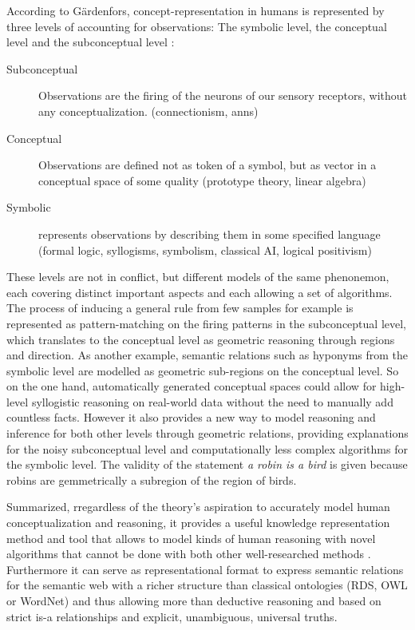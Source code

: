 According to Gärdenfors, concept-representation in humans is represented by three levels of accounting for observations: The symbolic level, the conceptual level and the subconceptual level \cite[204]{Gardenfors2000a}:
\begin{description}
    \item[Subconceptual] Observations are the firing of the neurons of our sensory receptors, without any conceptualization.  (connectionism, \glspl{ann})
    \item[Conceptual] Observations are defined not as token of a symbol, but as vector in a conceptual space of some quality  (prototype theory, linear algebra)
    \item[Symbolic] represents observations by describing them in some specified language (formal logic, syllogisms, symbolism, classical AI, logical positivism)
\end{description}

These levels are not in conflict, but different models of the same phenonemon, each covering distinct important aspects and each allowing a set of algorithms. The process of inducing a general rule from few samples for example is represented as pattern-matching on the firing patterns in the subconceptual level, which translates to the conceptual level as geometric reasoning through regions and direction. As another example, semantic relations such as hyponyms from the symbolic level are modelled as geometric sub-regions on the conceptual level. So on the one hand, automatically generated conceptual spaces could allow for high-level syllogistic reasoning on real-world data without the need to manually add countless facts. However it also provides a new way to model reasoning and inference for both other levels through geometric relations, providing explanations for the noisy subconceptual level and computationally less complex algorithms for the symbolic level. The validity of the statement \textit{a robin is a bird} is given because robins are gemmetrically a subregion of the region of birds.

Summarized, rregardless of the theory's aspiration to accurately model human conceptualization and reasoning, it provides a useful knowledge representation method and tool that allows to model kinds of human reasoning with novel algorithms that cannot be done with both other well-researched methods \cite[Sec.~6.7]{Gardenfors2000a}. Furthermore it can serve as representational format to express semantic relations for the semantic web \cite{Gardenfors2004} with a richer structure than classical ontologies (\eg RDS, OWL or WordNet) and thus allowing more than deductive reasoning and based on strict is-a relationships and explicit, unambiguous, universal truths.


